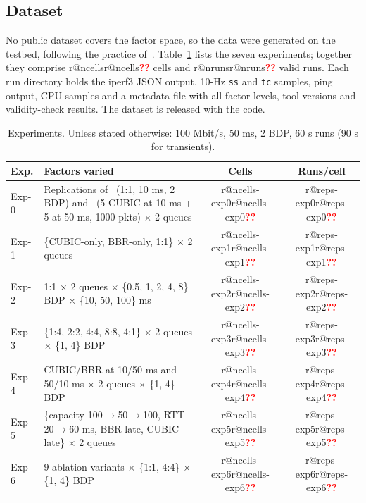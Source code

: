 \documentclass[conference]{IEEEtran}
\makeatletter
\newcommand{\R}[1]{\ifcsname r@#1\endcsname\csname r@#1\endcsname\else\textcolor{red}{\textbf{??}}\fi}
\makeatother
\begin{document}
\subsection{Dataset}
No public dataset covers the factor space, so the data were generated on the testbed, following the practice of~\cite{sarpkaya2025sharing,bless2025bbrv3,sarpkaya2025l4s,scherrer2026control}. Table~\ref{tab:exps} lists the seven experiments; together they comprise \R{ncells} cells and \R{nruns} valid runs. Each run directory holds the iperf3 JSON output, 10-Hz \texttt{ss} and \texttt{tc} samples, ping output, CPU samples and a metadata file with all factor levels, tool versions and validity-check results. The dataset is released with the code.

\begin{table}[t]
\centering
\caption{Experiments. Unless stated otherwise: 100 Mbit/s, 50 ms, 2 BDP, 60 s runs (90 s for transients).}
\label{tab:exps}
\footnotesize
\begin{tabular}{@{}p{12mm}p{40mm}cc@{}}
\toprule
Exp. & Factors varied & Cells & Runs/cell \\
\midrule
Exp-0 & Replications of~\cite{sarpkaya2025l4s} (1:1, 10 ms, 2 BDP) and~\cite{kumari2025cubic} (5 CUBIC at 10 ms + 5 at 50 ms, 1000 pkts) $\times$ 2 queues & \R{ncells-exp0} & \R{reps-exp0} \\
Exp-1 & \{CUBIC-only, BBR-only, 1:1\} $\times$ 2 queues & \R{ncells-exp1} & \R{reps-exp1} \\
Exp-2 & 1:1 $\times$ 2 queues $\times$ \{0.5, 1, 2, 4, 8\} BDP $\times$ \{10, 50, 100\} ms & \R{ncells-exp2} & \R{reps-exp2} \\
Exp-3 & \{1:4, 2:2, 4:4, 8:8, 4:1\} $\times$ 2 queues $\times$ \{1, 4\} BDP & \R{ncells-exp3} & \R{reps-exp3} \\
Exp-4 & CUBIC/BBR at 10/50 ms and 50/10 ms $\times$ 2 queues $\times$ \{1, 4\} BDP & \R{ncells-exp4} & \R{reps-exp4} \\
Exp-5 & \{capacity 100$\to$50$\to$100, RTT 20$\to$60 ms, BBR late, CUBIC late\} $\times$ 2 queues & \R{ncells-exp5} & \R{reps-exp5} \\
Exp-6 & 9 ablation variants $\times$ \{1:1, 4:4\} $\times$ \{1, 4\} BDP & \R{ncells-exp6} & \R{reps-exp6} \\
\bottomrule
\end{tabular}
\end{table}
\end{document}
